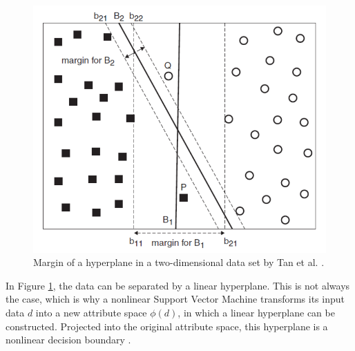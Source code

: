     \begin{figure}
        \centering
        \caption{Margin of a hyperplane in a two-dimensional data set by Tan et al. \cite{DBLP:books/aw/TanSKK2019}.
        \label{fig:svm}
        }
        \includegraphics[scale=0.7]{Images/SVM_image.png}
    \end{figure}
    

    In Figure \ref{fig:svm}, the data can be separated by a linear hyperplane. This is not always the case, which is why a nonlinear Support Vector Machine transforms its input data $d$ into a new attribute space $\phi(d)$, in which a linear hyperplane can be constructed. Projected into the original attribute space, this hyperplane is a nonlinear decision boundary \cite{DBLP:books/aw/TanSKK2019}.
    